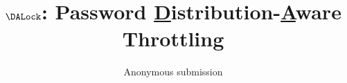 \documentclass[runningheads]{llncs}
\begin{document}
%
\title{$\DALock$: Password \underline{D}istribution-\underline{A}ware Throttling}
%
%
\author{Anonymous submission}
%
%
%
\maketitle              %
%
\begin{abstract}


\end{abstract}

%
%
%
 

%
%
% 
%




\end{document}
